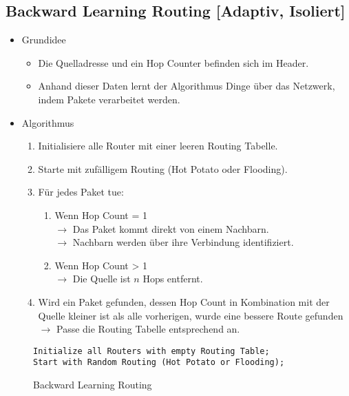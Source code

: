         \subsection{Backward Learning Routing [Adaptiv, Isoliert]}
            \begin{itemize}
            	\item Grundidee
	            	\begin{itemize}
	            		\item Die Quelladresse und ein Hop Counter befinden sich im Header.
	            		\item Anhand dieser Daten lernt der Algorithmus Dinge über das Netzwerk, indem Pakete verarbeitet werden.
	            	\end{itemize}
	            \item Algorithmus
		            \begin{enumerate}
		            	\item Initialisiere alle Router mit einer leeren Routing Tabelle.
		            	\item Starte mit zufälligem Routing (Hot Potato oder Flooding).
		            	\item Für jedes Paket tue:
			            	\begin{enumerate}
			            		\item Wenn Hop Count = 1
				            	   \\ \(\rightarrow\) Das Paket kommt direkt von einem Nachbarn.
				            	   \\ \(\rightarrow\) Nachbarn werden über ihre Verbindung identifiziert.
				            	\item Wenn Hop Count > 1
				            	   \\ \(\rightarrow\) Die Quelle ist \(n\) Hops entfernt.
			            	\end{enumerate}
			            \item Wird ein Paket gefunden, dessen Hop Count in Kombination mit der Quelle kleiner ist als alle vorherigen, wurde eine bessere Route gefunden
			               \\ \(\rightarrow\) Passe die Routing Tabelle entsprechend an.
		            \end{enumerate}
            \end{itemize}
            \begin{figure}[H]
            	\centering
            	\begin{lstlisting}
Initialize all Routers with empty Routing Table;
Start with Random Routing (Hot Potato or Flooding);
            	\end{lstlisting}
            	\caption{Backward Learning Routing}
            \end{figure}

